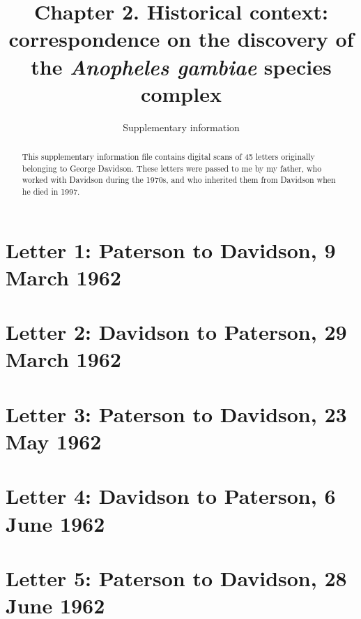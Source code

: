\documentclass[a4paper,11pt,abstracton,hidelinks]{scrartcl}
\title{
Chapter 2. Historical context: correspondence on the discovery of the \textit{Anopheles gambiae} species complex
}
\subtitle{Supplementary information}
\author{}
\begin{document}
\renewcommand{\abstractname}{Summary}


\maketitle


\begin{abstract}
This supplementary information file contains digital scans of 45 letters originally belonging to George Davidson. These letters were passed to me by my father, who worked with Davidson during the 1970s, and who inherited them from Davidson when he died in 1997. 
\end{abstract}


\tableofcontents


\clearpage

\section{Letter 1: Paterson to Davidson, 9 March 1962}


\section{Letter 2: Davidson to Paterson, 29 March 1962}


\section{Letter 3: Paterson to Davidson, 23 May 1962}


\section{Letter 4: Davidson to Paterson, 6 June 1962}


\section{Letter 5: Paterson to Davidson, 28 June 1962}

\end{document}
